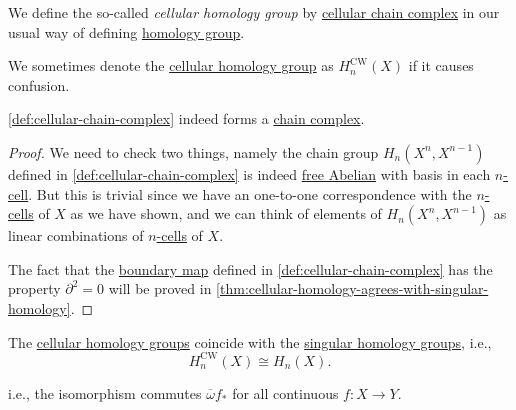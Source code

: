 \begin{definition}\label{def:cellular-homology-group}
	We define the so-called \emph{cellular homology group} by \hyperref[def:cellular-chain-complex]{cellular chain complex} in our usual way of defining
	\hyperref[def:homology-group]{homology group}.
\end{definition}
\begin{remark}
	We sometimes denote the \hyperref[def:cellular-homology-group]{cellular homology group} as \(H_n^{\mathrm{CW} }(X) \) if it causes confusion.
\end{remark}
\begin{theorem}\label{thm:lec32}
	\autoref{def:cellular-chain-complex} indeed forms a \hyperref[def:chain-complex]{chain complex}.
\end{theorem}
\begin{proof}
	We need to check two things, namely the chain group \(H_n(X^n, X^{n-1} )\) defined in \autoref{def:cellular-chain-complex}
	is indeed \hyperref[def:free-Abelian-group]{free Abelian} with basis in each \hyperref[def:cell]{\(n\)-cell}. But this is trivial since we have
	an one-to-one correspondence with the \hyperref[def:cell]{\(n\)-cells} of \(X\) as we have shown, and we can think of elements of \(H_n(X^n, X^{n-1} )\)
	as linear combinations of \hyperref[def:cell]{\(n\)-cells} of \(X\).

	The fact that the \hyperref[def:boundary-homomorphism]{boundary map} defined in \autoref{def:cellular-chain-complex} has the property \(\partial ^{2} = 0\)
	will be proved in \autoref{thm:cellular-homology-agrees-with-singular-homology}.
\end{proof}
\begin{theorem}\label{thm:cellular-homology-agrees-with-singular-homology}
	The \hyperref[def:cellular-homology-group]{cellular homology groups} coincide with the \hyperref[def:singular-homology-group]{singular homology groups}, i.e.,
	\[
		H_n^{\mathrm{CW} }(X) \cong H_n(X).
	\]
\end{theorem}
\begin{note}
	i.e., the isomorphism commutes \(\overline{\omega} f_\ast\) for all continuous \(f\colon X\to Y\).
\end{note}

